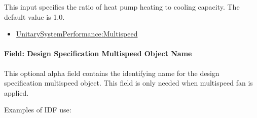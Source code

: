 This input specifies the ratio of heat pump heating to cooling capacity. The default value is 1.0.

\begin{itemize}
\tightlist
\item
  \hyperref[unitarysystemperformancemultispeed]{UnitarySystemPerformance:Multispeed}
\end{itemize}

\paragraph{Field: Design Specification Multispeed Object Name}\label{field-design-specification-multispeed-object-name-2}

This optional alpha field contains the identifying name for the design specification multispeed object. This field is only needed when multispeed fan is applied.

Examples of IDF use:

